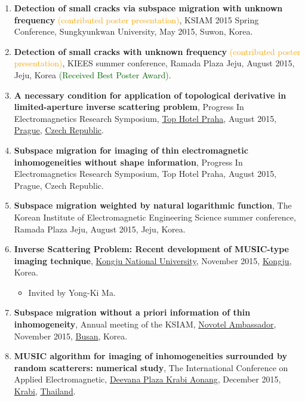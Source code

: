 \documentclass[10pt,A4]{article}
\begin{document}
\begin{enumerate}
\item\label{P-KSIAM2015B} \textbf{Detection of small cracks via subspace migration with unknown frequency} \textcolor{orange}{(contributed poster presentation)}, KSIAM 2015 Spring Conference, Sungkyunkwan University, May 2015, Suwon, Korea.
\item\label{P-KIEES2015B} \textbf{Detection of small cracks with unknown frequency} \textcolor{orange}{(contributed poster presentation)}, KIEES summer conference, Ramada Plaza Jeju, August 2015, Jeju, Korea \textcolor{darkgreen}{(Received Best Poster Award)}.
\item\label{P-PIERS2015A} \textbf{A necessary condition for application of topological derivative in limited-aperture inverse scattering problem}, Progress In Electromagnetics Research Symposium, \href{https://www.tophotel.cz}{Top Hotel Praha}, August 2015, \href{https://www.praha.eu/jnp/en/index.html}{Prague}, \href{https://www.visitczechrepublic.com/en-US}{Czech Republic}.
\item\label{P-PIERS2015B} \textbf{Subspace migration for imaging of thin electromagnetic inhomogeneities without shape information}, Progress In Electromagnetics Research Symposium, Top Hotel Praha, August 2015, Prague, Czech Republic.
\item\label{P-PIERS2015C} \textbf{Subspace migration weighted by natural logarithmic function}, The Korean Institute of Electromagnetic Engineering Science summer conference, Ramada Plaza Jeju, August 2015, Jeju, Korea.
\item\label{P-KONGJU2015} \textbf{Inverse Scattering Problem: Recent development of MUSIC-type imaging technique}, \href{http://www.kongju.ac.kr/}{Kongju National University}, November 2015, \href{https://www.gongju.go.kr}{Kongju}, Korea.
\begin{itemize}
\item Invited by Yong-Ki Ma.
\end{itemize}
\item\label{P-KSIAM2015C} \textbf{Subspace migration without a priori information of thin inhomogeneity}, Annual meeting of the KSIAM, \href{https://novotel.ambatel.com/busan/main.amb/}{Novotel Ambassador}, November 2015, \href{http://english.busan.go.kr/index}{Busan}, Korea.
\item\label{P-APPEIC2015} \textbf{MUSIC algorithm for imaging of inhomogeneities surrounded by random scatterers: numerical study}, The  International Conference on Applied Electromagnetic, \href{http://www.deevanaplazakrabi.com/}{Deevana Plaza Krabi Aonang}, December 2015, \href{https://en.wikipedia.org/wiki/Krabi}{Krabi}, \href{https://www.thaigov.go.th}{Thailand}.

\end{enumerate}
\end{document}
